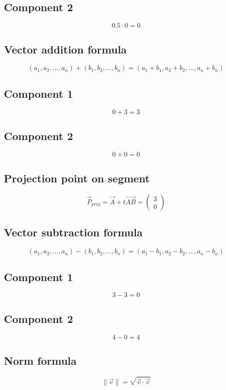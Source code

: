 \documentclass{article}
\begin{document}
\subsection*{ \vspace{1em} Component 2}
\[
0.5 \cdot 0 = 0
\]
\subsection*{ \vspace{1em} Vector addition formula}
\[
(a_1, a_2, \dots, a_n) + (b_1, b_2, \dots, b_n) = (a_1 + b_1, a_2 + b_2, \dots, a_n + b_n)
\]
\subsection*{ \vspace{1em} Component 1}
\[
0 + 3 = 3
\]
\subsection*{ \vspace{1em} Component 2}
\[
0 + 0 = 0
\]
\subsection*{ \vspace{1em} Projection point on segment}
\[
\vec{P}_{proj} = \vec{A} + t \vec{AB} = \begin{pmatrix}3 \\ 0\end{pmatrix}
\]
\subsection*{ \vspace{1em} Vector subtraction formula}
\[
(a_1, a_2, \dots, a_n) - (b_1, b_2, \dots, b_n) = (a_1 - b_1, a_2 - b_2, \dots, a_n - b_n)
\]
\subsection*{ \vspace{1em} Component 1}
\[
3 - 3 = 0
\]
\subsection*{ \vspace{1em} Component 2}
\[
4 - 0 = 4
\]
\subsection*{ \vspace{1em} Norm formula}
\[
\|\vec{v}\| = \sqrt{\vec{v} \cdot \vec{v}}
\]
\end{document}
